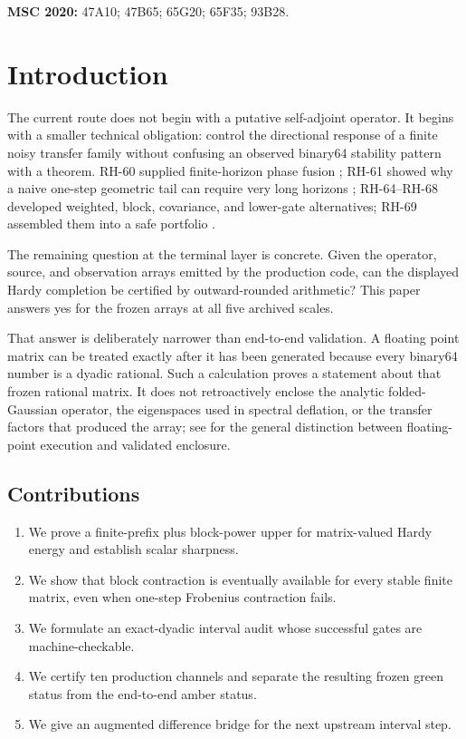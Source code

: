 \documentclass[11pt]{article}
\theoremstyle{definition}
\begin{document}
\medskip
\noindent\textbf{MSC 2020:} 47A10; 47B65; 65G20; 65F35; 93B28.

\section{Introduction}

The current route does not begin with a putative self-adjoint operator.  It
begins with a smaller technical obligation: control the directional response
of a finite noisy transfer family without confusing an observed binary64
stability pattern with a theorem.  RH-60 supplied finite-horizon phase fusion
\citep{WangPhaseTail2026}; RH-61 showed why a naive one-step geometric tail
can require very long horizons \citep{WangHorizonBarrier2026}; RH-64--RH-68
developed weighted, block, covariance, and lower-gate alternatives; RH-69
assembled them into a safe portfolio
\citep{WangWeightedResiduals2026,WangPortfolio2026}.

The remaining question at the terminal layer is concrete.  Given the
operator, source, and observation arrays emitted by the production code, can
the displayed Hardy completion be certified by outward-rounded arithmetic?
This paper answers yes for the frozen arrays at all five archived scales.

That answer is deliberately narrower than end-to-end validation.  A floating
point matrix can be treated exactly after it has been generated because every
binary64 number is a dyadic rational.  Such a calculation proves a statement
about that frozen rational matrix.  It does not retroactively enclose the
analytic folded-Gaussian operator, the eigenspaces used in spectral
deflation, or the transfer factors that produced the array; see
\citep{Higham2002} for the general distinction between floating-point
execution and validated enclosure.

\subsection*{Contributions}

\begin{enumerate}[leftmargin=2.2em]
 \item We prove a finite-prefix plus block-power upper for matrix-valued Hardy
       energy and establish scalar sharpness.
 \item We show that block contraction is eventually available for every
       stable finite matrix, even when one-step Frobenius contraction fails.
 \item We formulate an exact-dyadic interval audit whose successful gates are
       machine-checkable.
 \item We certify ten production channels and separate the resulting frozen
       green status from the end-to-end amber status.
 \item We give an augmented difference bridge for the next upstream interval
       step.
\end{enumerate}
\end{document}

